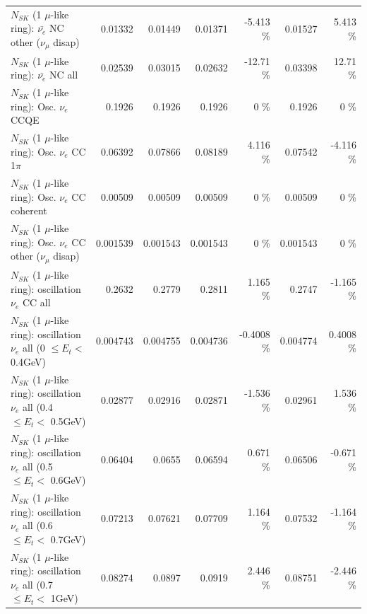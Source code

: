 \begin{table}
\begin{tabular}{| l | r | r | r  r | r  r |}
          $N_{SK}$ (1 $\mu$-like ring): $\bar{\nu_e}$ NC other ($\nu_\mu$ disap) &         0.01332 &         0.01449 &         0.01371 &   -5.413 \%  &         0.01527 &    5.413 \%  \\ 
                            $N_{SK}$ (1 $\mu$-like ring): $\bar{\nu_{e}}$ NC all &         0.02539 &         0.03015 &         0.02632 &   -12.71 \%  &         0.03398 &    12.71 \%  \\ 
\hline
\hline
\hline
                                 $N_{SK}$ (1 $\mu$-like ring): Osc. $\nu_e$ CCQE &          0.1926 &          0.1926 &          0.1926 &        0 \%  &          0.1926 &        0 \%  \\ 
                            $N_{SK}$ (1 $\mu$-like ring): Osc. $\nu_e$ CC 1$\pi$ &         0.06392 &         0.07866 &         0.08189 &    4.116 \%  &         0.07542 &   -4.116 \%  \\ 
                          $N_{SK}$ (1 $\mu$-like ring): Osc. $\nu_e$ CC coherent &         0.00509 &         0.00509 &         0.00509 &        0 \%  &         0.00509 &        0 \%  \\ 
           $N_{SK}$ (1 $\mu$-like ring): Osc. $\nu_e$ CC other ($\nu_\mu$ disap) &        0.001539 &        0.001543 &        0.001543 &        0 \%  &        0.001543 &        0 \%  \\ 
                        $N_{SK}$ (1 $\mu$-like ring): oscillation $\nu_e$ CC all &          0.2632 &          0.2779 &          0.2811 &    1.165 \%  &          0.2747 &   -1.165 \%  \\ 
\hline
$N_{SK}$ (1 $\mu$-like ring): oscillation $\nu_{e}$ all (0 $\leq E_{t} <$ 0.4GeV) &        0.004743 &        0.004755 &        0.004736 &  -0.4008 \%  &        0.004774 &   0.4008 \%  \\ 
$N_{SK}$ (1 $\mu$-like ring): oscillation $\nu_{e}$ all (0.4 $\leq E_{t} <$ 0.5GeV) &         0.02877 &         0.02916 &         0.02871 &   -1.536 \%  &         0.02961 &    1.536 \%  \\ 
$N_{SK}$ (1 $\mu$-like ring): oscillation $\nu_{e}$ all (0.5 $\leq E_{t} <$ 0.6GeV) &         0.06404 &          0.0655 &         0.06594 &    0.671 \%  &         0.06506 &   -0.671 \%  \\ 
$N_{SK}$ (1 $\mu$-like ring): oscillation $\nu_{e}$ all (0.6 $\leq E_{t} <$ 0.7GeV) &         0.07213 &         0.07621 &         0.07709 &    1.164 \%  &         0.07532 &   -1.164 \%  \\ 
$N_{SK}$ (1 $\mu$-like ring): oscillation $\nu_{e}$ all (0.7 $\leq E_{t} <$ 1GeV) &         0.08274 &          0.0897 &          0.0919 &    2.446 \%  &         0.08751 &   -2.446 \%  \\ 

\end{tabular}
\end{table}
